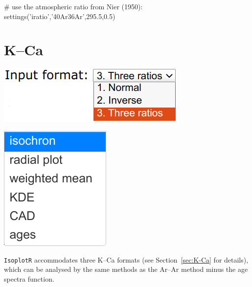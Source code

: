 \begin{refsection}
\begin{script}
# use the atmospheric ratio from Nier (1950):
settings('iratio','40Ar36Ar',295.5,0.5)
\end{script}

\section{K--Ca}\label{sec:KCa-R}

\noindent\begin{minipage}[t]{.3\linewidth}
\strut\vspace*{-\baselineskip}\newline
\includegraphics[width=\linewidth]{../figures/PbPbFormats.png}
\end{minipage}
\noindent\begin{minipage}[t]{.15\linewidth}
\strut\vspace*{-\baselineskip}\newline
\includegraphics[width=\linewidth]{../figures/PbPbPlotdevices.png}\\
\end{minipage}
\begin{minipage}[t]{.55\textwidth}
  \texttt{IsoplotR} accommodates three K--Ca formats (see
  Section~\ref{sec:K-Ca} for details), which can be analysed by the
  same methods as the Ar--Ar method minus the age spectra function.
\end{minipage}


\end{refsection}
